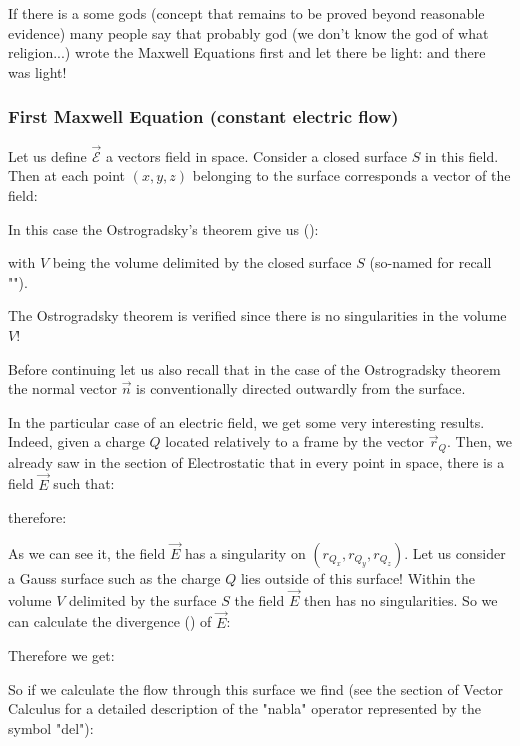 	If there is a some gods (concept that remains to be proved beyond reasonable evidence) many people say that probably god (we don't know the god of what religion...) wrote the Maxwell Equations first and let there be light: and there was light!
	
	\subsubsection{First Maxwell Equation (constant electric flow)}\label{first maxwell equation}
	Let us define $\vec{\mathcal{E}}$ a vectors field in space. Consider a closed surface $S$ in this field. Then at each point $(x, y, z)$ belonging to the surface corresponds a vector of the field:
	
	In this case the Ostrogradsky's theorem give us ():
	
	with $V$ being the volume delimited by the closed surface $S$ (so-named for recall "").
	\begin{tcolorbox}[title=Remark,colframe=black,arc=10pt]
	The Ostrogradsky theorem is verified since there is no singularities in the volume $V$!
	\end{tcolorbox}
	Before continuing let us also recall that in the case of the Ostrogradsky theorem the normal vector $\vec{n}$ is conventionally directed outwardly from the surface.
	
	In the particular case of an electric field, we get some very interesting results. Indeed, given a charge $Q$ located relatively to a frame by the vector $\vec{r}_Q$. Then, we already saw in the section of Electrostatic that in every point in space, there is a field $\vec{E}$ such that:
	
	therefore:
	
	As we can see it, the field $\vec{E}$ has a singularity on $(r_{Q_x},r_{Q_y},r_{Q_z})$. Let us consider a Gauss surface such as the charge $Q$ lies outside of this surface! Within the volume $V$ delimited by the surface $S$ the field $\vec{E}$ then has no singularities. So we can calculate the divergence () of $\vec{E}$:
	
	Therefore we get:
	
	So if we calculate the flow through this surface we find (see the section of Vector Calculus for a detailed description of the "nabla" operator represented by the symbol "del"):
	
